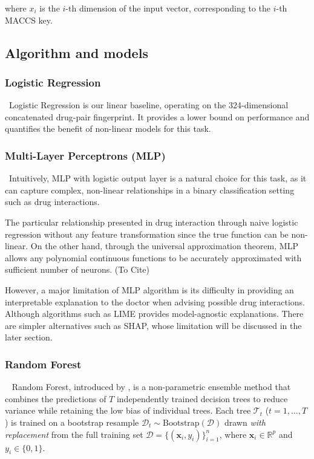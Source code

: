 \documentclass[letterpaper]{article} %
\begin{document}
where $x_i$ is the $i$-th dimension of the input vector, corresponding to the $i$-th MACCS key. 

\subsection{Algorithm and models}

\subsubsection{Logistic Regression}
\
Logistic Regression is our linear baseline, operating on the 324-dimensional concatenated drug-pair fingerprint. It provides a lower bound on performance and quantifies the benefit of non-linear models for this task.

\subsubsection{Multi-Layer Perceptrons (MLP)}
\ 
Intuitively, MLP with logistic output layer is a natural choice for this task, as it can capture complex, non-linear relationships in a binary classification setting such as drug interactions.

The particular relationship presented in drug interaction through naive logistic regression without any feature transformation since the true function can be non-linear. On the other hand, through the universal approximation theorem, MLP allows any polynomial continuous functions to be accurately approximated with sufficient number of neurons. (To Cite)

However, a major limitation of MLP algorithm is its difficulty in providing an interpretable explanation to the doctor when advising possible drug interactions. Although algorithms such as LIME provides model-agnostic explanations. There are simpler alternatives such as SHAP, whose limitation will be discussed in the later section.

\subsubsection{Random Forest}
\
\newline
Random Forest, introduced by \citet{Breiman2001}, is a non-parametric ensemble method that combines the predictions of $T$ independently trained decision trees to reduce variance while retaining the low bias of individual trees. Each tree $\mathcal{T}_t$ ($t = 1, \ldots, T$) is trained on a bootstrap resample $\mathcal{D}_t \sim \text{Bootstrap}(\mathcal{D})$ drawn \emph{with replacement} from the full training set $\mathcal{D} = \{(\mathbf{x}_i, y_i)\}_{i=1}^{n}$, where $\mathbf{x}_i \in \mathbb{R}^{p}$ and $y_i \in \{0, 1\}$.
 
\end{document}
